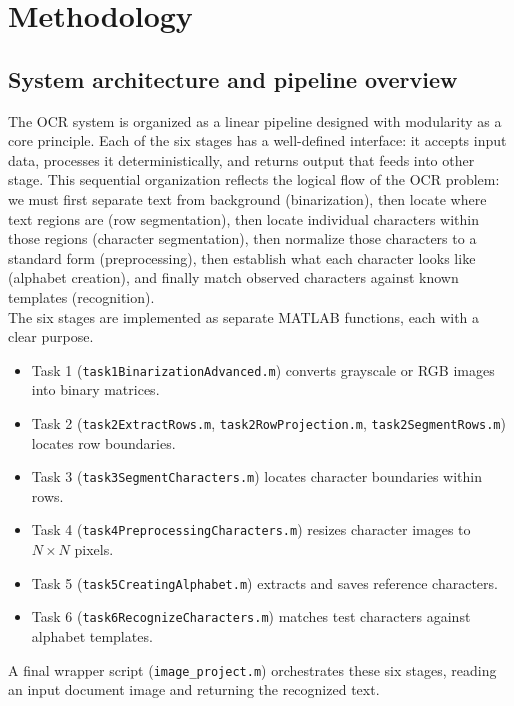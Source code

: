 \section{Methodology}
\subsection{System architecture and pipeline overview}
The OCR system is organized as a linear pipeline designed with modularity as a core principle. Each of the six stages has a well-defined interface: it accepts input data, processes it deterministically, and returns output that feeds into other stage. This sequential organization reflects the logical flow of the OCR problem: we must first separate text from background (binarization), then locate where text regions are (row segmentation), then locate individual characters within those regions (character segmentation), then normalize those characters to a standard form (preprocessing), then establish what each character looks like (alphabet creation), and finally match observed characters against known templates (recognition).\\
The six stages are implemented as separate MATLAB functions, each with a clear purpose.\\
\begin{itemize}
    \item Task 1 (\texttt{task1BinarizationAdvanced.m}) converts grayscale or RGB images into binary matrices.
    \item Task 2 (\texttt{task2ExtractRows.m}, \texttt{task2RowProjection.m}, \texttt{task2SegmentRows.m}) locates row boundaries.
    \item Task 3 (\texttt{task3SegmentCharacters.m}) locates character boundaries within rows.
    \item Task 4 (\texttt{task4PreprocessingCharacters.m}) resizes character images to $N \times N$ pixels.
    \item Task 5 (\texttt{task5CreatingAlphabet.m}) extracts and saves reference characters.
    \item Task 6 (\texttt{task6RecognizeCharacters.m}) matches test characters against alphabet templates.
\end{itemize}
A final wrapper script (\texttt{image\_project.m}) orchestrates these six stages, reading an input document image and returning the recognized text. 








